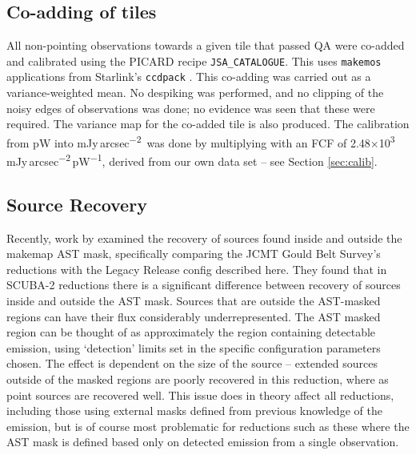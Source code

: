 \documentclass[twocolumn,times]{aastex6}
\newcommand{\um}{\micron}
\newcommand{\todo}[1]{\textcolor{red}{TODO: #1}}
\newcommand{\ascl}[1]{\href{http://www.ascl.net/#1}{ascl:#1}}
\newcommand{\jyas}{Jy\,arcsec\textsuperscript{$-$2}}
\begin{document}



\subsection{Co-adding of tiles}
\label{sec:coadd}
All non-pointing observations towards a given tile that passed QA were
co-added and calibrated using the PICARD recipe
\texttt{JSA\_CATALOGUE}. This uses \texttt{makemos} applications from
Starlink's \texttt{ccdpack} \citep[][\ascl{1403.021}]{SUN139}. This
co-adding was carried out as a variance-weighted mean. No despiking
was performed, and no clipping of the noisy edges of observations was
done; no evidence was seen that these were required. The variance map
for the co-added tile is also produced. The calibration from pW into
m\jyas\ was done by multiplying with an FCF of
2.48$\times$10\textsuperscript{3}\,m\jyas\,pW\textsuperscript{$-$1},
derived from our own data set -- see Section \ref{sec:calib}.

\subsection{Source Recovery}
Recently, work by \citet{Mairs2015} examined the recovery of sources
found inside and outside the makemap AST mask, specifically comparing
the JCMT Gould Belt Survey's reductions with the Legacy Release config
described here. They found that in SCUBA-2 reductions there is a
significant difference between recovery of sources inside and outside
the AST mask. Sources that are outside the AST-masked regions can have
their flux considerably underrepresented. The AST masked region can be
thought of as approximately the region containing detectable emission,
using `detection' limits set in the specific configuration parameters
chosen. The effect is dependent on the size of the source -- extended
sources outside of the masked regions are poorly recovered in this
reduction, where as point sources are recovered well.  This issue does
in theory affect all reductions, including those using external masks
defined from previous knowledge of the emission, but is of course most
problematic for reductions such as these where the AST mask is defined
based only on detected emission from a single observation.
\end{document}
